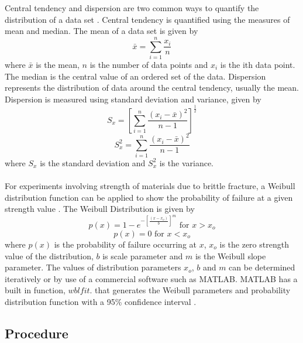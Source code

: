 \documentclass[12pt]{article}
\begin{document}
Central tendency and dispersion are two common ways to quantify the distribution of a data set \cite{Shukla}. Central tendency is quantified using the measures of mean and median. The mean of a data set is given by
\begin{equation}
\bar{x} = \sum_{i=1}^{n}\frac{x_{i}}{n}
\end{equation}
where $\bar{x}$ is the mean, $n$ is the number of data points and $x_{i}$ is the ith data point. The median is the central value of an ordered set of the data. Dispersion represents the distribution of data around the central tendency, usually the mean. Dispersion is measured using standard deviation and variance, given by 
\begin{equation}
S_{x} = \left[\sum_{i=1}^{n}\frac{\left(x_{i}-\bar{x}\right)^2}{n-1}\right]^\frac{1}{2}
\end{equation}  
\begin{equation}
S_{x}^2 = \sum_{i=1}^{n}\frac{\left(x_{i}-\bar{x}\right)^2}{n-1}
\end{equation} 
where $S_{x}$ is the standard deviation and $S_{x}^2$ is the variance.
\\ \\
For experiments involving strength of materials due to brittle fracture, a Weibull distribution function can be applied to show the probability of failure at a given strength value \cite{Shukla}. The Weibull Distribution is given by
\begin{equation}
p(x) = 1-e^{-\left[\frac{\left(x-x_{o}\right)}{b}\right]^m} \text{ for } x > x_{o}
\end{equation}
\begin{equation}
p(x) = 0  \text { for } x < x_{o}
\end{equation} 
where $p(x)$ is the probability of failure occurring at $x$, $x_{o}$ is the zero strength value of the distribution, $b$ is scale parameter and $m$ is the Weibull slope parameter. The values of distribution parameters $x_{o}$, $b$ and $m$ can be determined iteratively or by use of a commercial software such as MATLAB. MATLAB has a built in function, $wblfit$. that generates the Weibull parameters and probability distribution function with a 95\% confidence interval \cite{MATLAB}.

\subsection{Procedure} %
\end{document}
